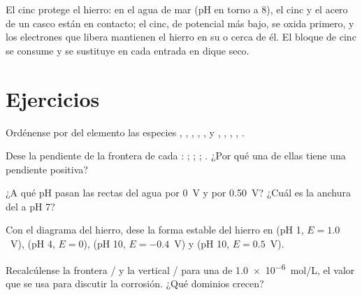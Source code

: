 El cinc protege el hierro: en el agua de mar (pH en torno a 8), el cinc y
el acero de un casco están en contacto; el cinc, de potencial más bajo,
se oxida primero, y los electrones que libera mantienen el hierro en su
 o cerca de él. El bloque de cinc se consume y se
sustituye en cada entrada en dique seco.

\section{Ejercicios}

\begin{exercise}[$\star$]\label{exo:b1:e-ph-diagrams:1}
Ordénense por  del elemento las especies ,
, , , , y , ,
,
, .
\end{exercise}

\begin{exercise}[$\star$]\label{exo:b1:e-ph-diagrams:2}
Dese la pendiente de la frontera de cada :
; ;
; .
¿Por qué una de ellas tiene una pendiente positiva?
\end{exercise}

\begin{exercise}[$\star$]\label{exo:b1:e-ph-diagrams:3}
¿A qué pH pasan las rectas del agua por 0~V y por \qty{0.50}{V}? ¿Cuál es
la anchura del  a pH 7?
\end{exercise}

\begin{exercise}[$\star$]\label{exo:b1:e-ph-diagrams:4}
Con el diagrama del hierro, dese la forma estable del hierro en
(pH 1, $E = 1.0$~V), (pH 4, $E = 0$), (pH 10, $E = -0.4$~V) y
(pH 10, $E = 0.5$~V).
\end{exercise}

\begin{exercise}[$\star\star$]\label{exo:b1:e-ph-diagrams:5}
Recalcúlense la frontera / y la vertical
/ para una  de
\qty{1.0e-6}{mol/L}, el valor que se usa para discutir la corrosión. ¿Qué
dominios crecen?
\end{exercise}

